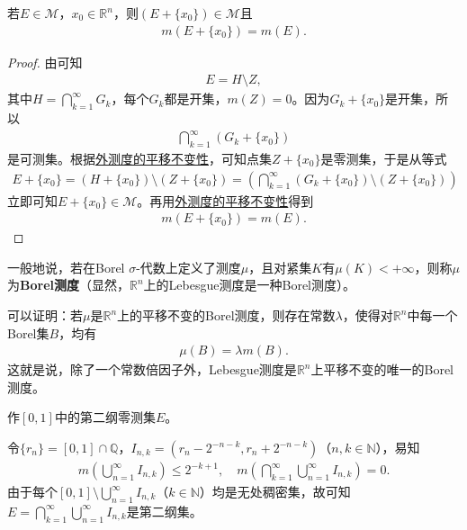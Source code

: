 \documentclass[../../main.tex]{subfiles}
\begin{document}
\begin{theorem}
若\(E \in \mathscr{M}\)，\(x_0 \in \mathbb{R}^n\)，则\((E + \{x_0\}) \in \mathscr{M}\)且
\begin{align*}
m(E + \{x_0\}) = m(E).
\end{align*}
\end{theorem}
\begin{proof}
由可知
\begin{align*}
E = H \setminus Z,
\end{align*}
其中\(H = \bigcap_{k = 1}^{\infty} G_k\)，每个\(G_k\)都是开集，\(m(Z) = 0\)。因为\(G_k + \{x_0\}\)是开集，所以
\begin{align*}
\bigcap_{k = 1}^{\infty} (G_k + \{x_0\})
\end{align*}
是可测集。根据\hyperref[theorem:外测度的平移不变性]{外测度的平移不变性}，可知点集\(Z + \{x_0\}\)是零测集，于是从等式
\begin{align*}
E + \{x_0\}= (H + \{x_0\}) \setminus (Z + \{x_0\})
= \left(\bigcap_{k = 1}^{\infty} (G_k + \{x_0\}) \setminus (Z + \{x_0\})\right)
\end{align*}
立即可知\(E + \{x_0\} \in \mathscr{M}\)。再用\hyperref[theorem:外测度的平移不变性]{外测度的平移不变性}得到
\begin{align*}
m(E + \{x_0\}) = m(E).
\end{align*}

\end{proof}
\begin{remark}
一般地说，若在Borel \(\sigma\)-代数上定义了测度\(\mu\)，且对紧集\(K\)有\(\mu(K)<+\infty\)，则称\(\mu\)为\textbf{Borel测度}（显然，\(\mathbb{R}^n\)上的Lebesgue测度是一种Borel测度）。

可以证明：若\(\mu\)是\(\mathbb{R}^n\)上的平移不变的Borel测度，则存在常数\(\lambda\)，使得对\(\mathbb{R}^n\)中每一个Borel集\(B\)，均有
\begin{align*}
\mu(B)=\lambda m(B).
\end{align*}
这就是说，除了一个常数倍因子外，Lebesgue测度是\(\mathbb{R}^n\)上平移不变的唯一的Borel测度。 
\end{remark}

\begin{example}
作\([0,1]\)中的第二纲零测集\(E\)。
\end{example}
\begin{solution}
令\(\{r_n\}=[0,1]\cap\mathbb{Q}\)，\(I_{n,k}=(r_n - 2^{-n - k},r_n + 2^{-n - k})\)（\(n,k\in\mathbb{N}\)），易知
\begin{align*}
m\left(\bigcup_{n = 1}^{\infty}I_{n,k}\right)\leqslant 2^{-k + 1},\quad
m\left(\bigcap_{k = 1}^{\infty}\bigcup_{n = 1}^{\infty}I_{n,k}\right)= 0.
\end{align*}
由于每个\([0,1]\setminus\bigcup_{n = 1}^{\infty}I_{n,k}\)（\(k\in\mathbb{N}\)）均是无处稠密集，故可知\(E = \bigcap_{k = 1}^{\infty}\bigcup_{n = 1}^{\infty}I_{n,k}\)是第二纲集。

\end{solution}
\end{document}
